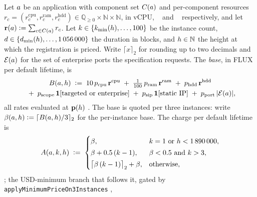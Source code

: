 \begin{definition}
\label{def:price}
Let $a$ be an application with component set $C(a)$ and per-component resources
$r_c = (r^{\mathrm{cpu}}_c, r^{\mathrm{ram}}_c, r^{\mathrm{hdd}}_c) \in \mathbb{Q}_{\ge 0} \times
\mathbb{N} \times \mathbb{N}$, in vCPU, \unit{\mega\byte} and \unit{\giga\byte} respectively, and let
$\mathbf{r}(a) \vcentcolon= \sum_{c \in C(a)} r_c$. Let $k \in \{k_{\min}(h), \dots, 100\}$ be
the instance count, $d \in \{d_{\min}(h), \dots, \num{1056000}\}$ the duration in blocks, and
$h \in \mathbb{N}$ the height at which the registration is priced. Write
$\lceil x \rceil_2$ for rounding up to two decimals and $\mathcal{E}(a)$ for the set of
enterprise ports the specification requests. The \emph{base}, in FLUX per default lifetime, is
\begin{multline*}
B(a,h) \;\vcentcolon=\;
10\,p_{\mathrm{cpu}}\,\mathbf{r}^{\mathrm{cpu}}
\;+\; \tfrac{1}{100}\,p_{\mathrm{ram}}\,\mathbf{r}^{\mathrm{ram}}
\;+\; p_{\mathrm{hdd}}\,\mathbf{r}^{\mathrm{hdd}} \\
{}\;+\; p_{\mathrm{scope}}\,\mathbf{1}\!\left[\text{targeted or enterprise}\right]
\;+\; p_{\mathrm{sip}}\,\mathbf{1}\!\left[\text{static IP}\right]
\;+\; p_{\mathrm{port}}\,\lvert\mathcal{E}(a)\rvert ,
\end{multline*}
all rates evaluated at $\mathbf{p}(h)$
. The base is quoted per
three instances: write $\beta(a,h) \vcentcolon= \lceil B(a,h)/3 \rceil_2$ for the per-instance
base. The charge per default lifetime is
\[
A(a,k,h) \;\vcentcolon=\;
\begin{cases}
\beta, & k = 1 \text{ or } h < \num{1890000},\\[2pt]
\beta + 0.5\,(k - 1), & \beta < 0.5 \text{ and } k > 3,\\[2pt]
\bigl\lceil \beta\,(k - 1)\bigr\rceil_2 + \beta, & \text{otherwise,}
\end{cases}
\]
; the USD-minimum branch that follows it, gated by
\texttt{apply\allowbreak{}Minimum\allowbreak{}Price\allowbreak{}On3Instances} ,

\end{definition}
